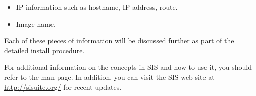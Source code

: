 \begin{itemize}
\item IP information such as hostname, IP address, route.
\item Image name.
\end{itemize}

Each of these pieces of information will be discussed further as part
of the detailed install procedure.

For additional information on the concepts in SIS and how to use it,
you should refer to the  man page.  In addition, you can
visit the SIS web site at \url{http://sisuite.org/} for recent
updates.

